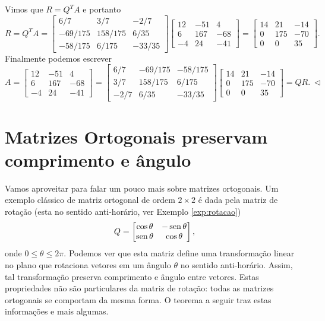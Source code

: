 \documentclass[../livro.tex]{subfiles}  %
\begin{document}
Vimos que $R=Q^T A$ e portanto
\begin{equation}
R = Q^T A =
\begin{bmatrix}
6/7 & 3/7 & -2/7 \\
-69/175 & 158/175 & 6/35   \\
-58/175& 6/175   &-33/35
\end{bmatrix}
\begin{bmatrix}
12 & -51 & 4 \\
6 & 167 & -68 \\
-4 & 24 & -41
\end{bmatrix} =
\begin{bmatrix}
14&21&-14\\
0&175&-70\\
0&0&35
\end{bmatrix} .
\end{equation} 
Finalmente podemos escrever
\begin{equation}
A =
\begin{bmatrix}
12 & -51 & 4 \\
6 & 167 & -68 \\
-4 & 24 & -41
\end{bmatrix} =
\begin{bmatrix}
6/7 & -69/175 & -58/175 \\
3/7 & 158/175 & 6/175   \\
-2/7& 6/35   &-33/35
\end{bmatrix}
\begin{bmatrix}
14&21&-14\\
0&175&-70\\
0&0&35
\end{bmatrix} = QR. \ \lhd
\end{equation}


\section{Matrizes Ortogonais preservam comprimento e ângulo}

Vamos aproveitar para falar um pouco mais sobre matrizes ortogonais. Um exemplo clássico de matriz ortogonal de ordem $2\times 2$ é dada pela matriz de rotação (esta no sentido anti-horário, ver Exemplo \ref{exp:rotacao})
\begin{equation}
Q =
\begin{bmatrix}
\cos \theta & -\operatorname{sen} \theta \\
\operatorname{sen} \theta & \cos \theta
\end{bmatrix} ,\end{equation}
onde $0 \leq \theta \leq 2 \pi$.
Podemos ver que esta matriz define uma transformação linear no plano que rotaciona vetores em um ângulo $\theta$ no sentido anti-horário.
Assim, tal transformação preserva comprimento e ângulo entre vetores.
Estas propriedades não são particulares da matriz de rotação: todas as matrizes ortogonais se comportam da mesma forma. O teorema a seguir traz estas informações e mais algumas.
\end{document}
